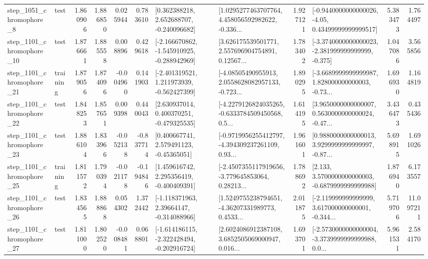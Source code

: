 \begin{tabular}{llrrrrllrlrr}
  step\_1051\_chromophore\_8 &      test &      1.860906 &    1.886850 &      0.025944 &  0.783610 &    [0.362388218, 2.652688707, -0.240096682] &  [1.0295277463707764, 4.458056592982622, -0.336... &       1.927121 &  [-0.9440000000000026, -4.05, 0.43499999999999517] &            5.383473 &          1.764497 \\
 step\_1101\_chromophore\_10 &      test &      1.876661 &    1.885558 &      0.008896 &  0.429618 &  [-2.166670862, -1.545910925, -0.288942969] &  [3.626175539501771, 2.557696904754891, 0.12567... &       1.783402 &  [-3.3740000000000023, -2.381999999999999, -0.375] &            1.047086 &          3.565856 \\
 step\_1101\_chromophore\_21 &  training &      1.879056 &    1.874096 &     -0.004960 &  0.141903 &   [-2.401319521, 1.211973939, -0.562427399] &  [-4.08505490955913, 2.0558628082957133, -0.723... &       1.890295 &  [-3.6689999999999987, 1.828000000000003, -0.73... &            1.696930 &          1.164819 \\
 step\_1101\_chromophore\_22 &      test &      1.848253 &    1.857651 &      0.009398 &  0.440043 &    [2.630937014, 0.400370251, -0.479325535] &  [-4.2279126824035265, -0.6333784509450568, 0.5... &       1.614195 &  [3.9650000000000007, 0.5630000000000024, -0.47... &            3.436473 &          0.435436 \\
 step\_1101\_chromophore\_23 &      test &      1.886104 &    1.833966 &     -0.052138 & -0.837714 &     [0.400667741, 2.579491123, -0.45365051] &  [-0.9719956255412797, -4.394309237261109, 0.93... &       1.961601 &  [0.9880000000000013, 3.9299999999999997, -0.87... &            5.698915 &          1.691026 \\
 step\_1101\_chromophore\_25 &  training &      1.811572 &    1.790394 &     -0.021178 & -0.194846 &    [1.459616742, 2.295356419, -0.400409391] &  [-2.4507355117919656, -3.779645853064, 0.28213... &       1.788692 &   [2.133, 3.5700000000000003, -0.6879999999999988] &            1.876940 &          6.173557 \\
 step\_1101\_chromophore\_26 &      test &      1.834565 &    1.888868 &      0.054302 &  1.372442 &    [-1.118371963, 2.39664147, -0.314088966] &  [1.5249755238794651, -4.36207331989773, 0.4533... &       2.011875 &  [-2.119999999999999, 3.617000000000001, -0.344... &            5.719706 &         11.097211 \\
 step\_1101\_chromophore\_27 &      test &      1.811000 &    1.802520 &     -0.008481 &  0.068801 &  [-1.614186115, -2.322428494, -0.202916724] &  [2.6024086912387108, 3.6852505069000947, 0.016... &       1.693701 &  [-2.5730000000000004, -3.3739999999999988, 0.0... &            5.961531 &          2.584170 \\

\end{tabular}
